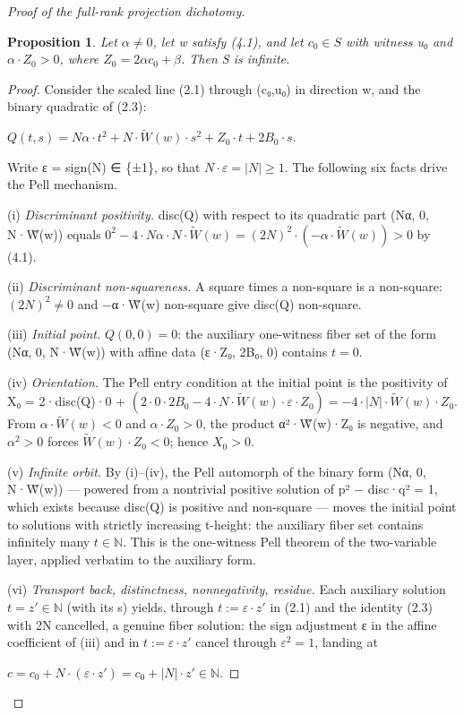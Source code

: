 \documentclass[11pt]{article}
\theoremstyle{plain}
\theoremstyle{definition}
\theoremstyle{remark}
\theoremstyle{plain}
\newtheorem*{proposition*}{Proposition}
\theoremstyle{definition}
\theoremstyle{remark}
\theoremstyle{plain}
\theoremstyle{definition}
\theoremstyle{remark}
\begin{document}
\begin{proof}[Proof of the full-rank projection dichotomy]
\begin{proposition*}
Let $α ≠ 0$, let w satisfy (4.1), and let $c_{0} ∈ S$ with witness u₀ and $α·Z_{0} > 0$, where $Z_{0} = 2αc_{0} + β$. Then S is infinite.

\end{proposition*}
\begin{proof}
Consider the scaled line (2.1) through (c₀,u₀) in direction w, and the binary quadratic of (2.3):

$Q(t,s) = Nα·t^{2} + N·\tilde{W}(w)·s^{2} + Z_{0}·t + 2B_{0}·s$.

Write ε = sign(N) ∈ \{±1\}, so that $N·ε = |N| ≥ 1$. The following six facts drive the Pell mechanism.

(i) \emph{Discriminant positivity.} disc(Q) with respect to its quadratic part (Nα, 0, N·W̃(w)) equals $0^{2} − 4·Nα·N·\tilde{W}(w) = (2N)^{2}·(−α·\tilde{W}(w)) > 0$ by (4.1).

(ii) \emph{Discriminant non-squareness.} A square times a non-square is a non-square: $(2N)^{2} ≠ 0$ and −α·W̃(w) non-square give disc(Q) non-square.

(iii) \emph{Initial point.} $Q(0,0) = 0$: the auxiliary one-witness fiber set of the form (Nα, 0, N·W̃(w)) with affine data (ε·Z₀, 2B₀, 0) contains $t = 0$.

(iv) \emph{Orientation.} The Pell entry condition at the initial point is the positivity of X₀ = 2·disc(Q)·0 + $(2·0·2B_{0} − 4·N·\tilde{W}(w)·ε·Z_{0}) = −4·|N|·\tilde{W}(w)·Z_{0}$. From $α·\tilde{W}(w) < 0$ and $α·Z_{0} > 0$, the product α²·W̃(w)·Z₀ is negative, and $α^{2} > 0$ forces $\tilde{W}(w)·Z_{0} < 0$; hence $X_{0} > 0$.

(v) \emph{Infinite orbit.} By (i)–(iv), the Pell automorph of the binary form (Nα, 0, N·W̃(w)) — powered from a nontrivial positive solution of p² − disc·q² = 1, which exists because disc(Q) is positive and non-square — moves the initial point to solutions with strictly increasing t-height: the auxiliary fiber set contains infinitely many $t ∈ ℕ$. This is the one-witness Pell theorem of the two-variable layer, applied verbatim to the auxiliary form.

(vi) \emph{Transport back, distinctness, nonnegativity, residue.} Each auxiliary solution $t = z′ ∈ ℕ$ (with its s) yields, through $t := ε·z′$ in (2.1) and the identity (2.3) with 2N cancelled, a genuine fiber solution: the sign adjustment ε in the affine coefficient of (iii) and in $t := ε·z′$ cancel through $ε^{2} = 1$, landing at

$c = c_{0} + N·(ε·z′) = c_{0} + |N|·z′ ∈ ℕ$.


\end{proof}
\end{proof}
\end{document}
